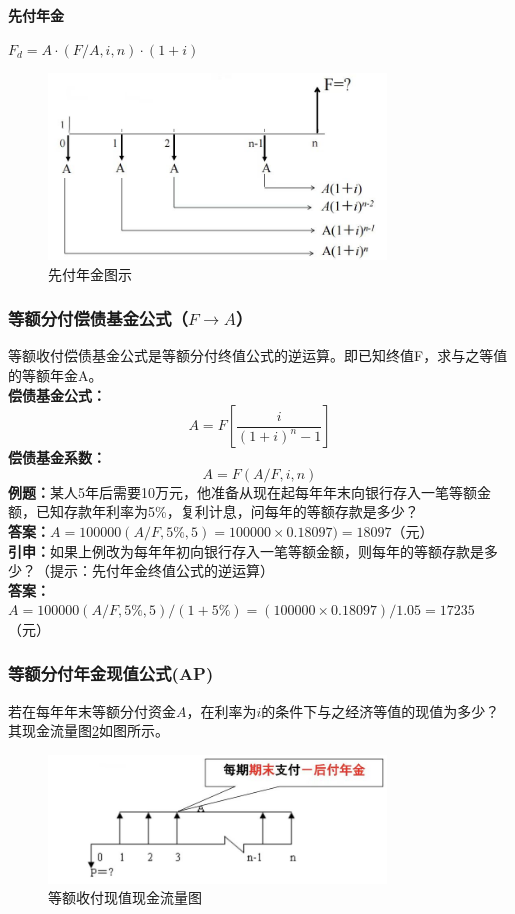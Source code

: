 \documentclass[12pt, a4paper, oneside]{ctexbook}
\begin{document}
\textbf{先付年金}

$F_d= A \cdot ( F / A , i , n ) \cdot (1 + i)$

\begin{figure}[H]
    \centering
    \includegraphics[width=0.8\textwidth]{image/先付年金图示.jpg}
    \caption{先付年金图示}
    \label{fig:8}
\end{figure}

\subsubsection{等额分付偿债基金公式（$F \to A$）}
等额收付偿债基金公式是等额分付终值公式的逆运算。即已知终值F，求与之等值的等额年金A。\\
\textbf{偿债基金公式：}
$$A=F[\frac{i}{(1+i)^n-1}]$$
\textbf{偿债基金系数：}
$$A = F ( A / F , i , n )$$
\textbf{例题：}某人5年后需要10万元，他准备从现在起每年年末向银行存入一笔等额金额，已知存款年利率为5\%，复利计息，问每年的等额存款是多少？\\
\textbf{答案：}$A=100000(A/F,5\%,5)=100000 \times 0.18097)=18097$（元）\\
\textbf{引申：}如果上例改为每年年初向银行存入一笔等额金额，则每年的等额存款是多少？（提示：先付年金终值公式的逆运算）\\
\textbf{答案：}$A=100000(A/F,5\%,5)/(1 + 5\%)= (100000 \times 0.18097)/1.05= 17235$（元）

\subsubsection{等额分付年金现值公式(AP)}
若在每年年末等额分付资金$A$，在利率为$i$的条件下与之经济等值的现值为多少？其现金流量图\ref{fig:9}如图所示。

\begin{figure}[H]
    \centering
    \includegraphics[width=0.8\textwidth]{image/等额收付现值现金流量图.jpg}
    \caption{等额收付现值现金流量图}
    \label{fig:9}
\end{figure}
\end{document}
